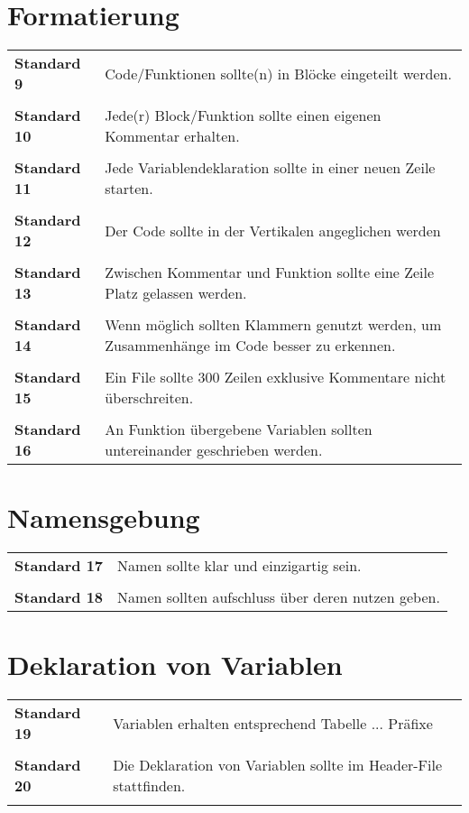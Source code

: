 \section{Formatierung}
\begin{table}[h]
	\begin{tabular}{lp{10cm}}
      \textbf{Standard 9}       & Code/Funktionen sollte(n) in Blöcke eingeteilt werden.\\\\
      \textbf{Standard 10}      & Jede(r) Block/Funktion sollte einen eigenen Kommentar erhalten.\\\\
      \textbf{Standard 11}     & Jede Variablendeklaration sollte in einer neuen Zeile starten.\\\\
      \textbf{Standard 12} & Der Code sollte in der Vertikalen angeglichen werden\\\\ 
      \textbf{Standard 13} & Zwischen Kommentar und Funktion sollte eine Zeile Platz gelassen werden. \\\\
      \textbf{Standard 14} & Wenn möglich sollten Klammern genutzt werden, um Zusammenhänge im Code besser zu erkennen.\\\\
      \textbf{Standard 15} & Ein File sollte 300 Zeilen exklusive Kommentare nicht überschreiten.\\\\
      \textbf{Standard 16} & An Funktion übergebene Variablen sollten untereinander geschrieben werden.
	\end{tabular}
\end{table}
\section{Namensgebung}
\begin{table}[h]
	\begin{tabular}{lp{10cm}}
     \textbf{Standard 17} & Namen sollte klar und einzigartig sein.\\\\
   \textbf{Standard 18}   & Namen sollten aufschluss über deren nutzen geben. 
	\end{tabular}
\end{table}\newpage
\section{Deklaration von Variablen}
\begin{table}[h]
	\begin{tabular}{lp{10cm}}
     \textbf{Standard 19} & Variablen erhalten entsprechend Tabelle ... Präfixe \\\\
\textbf{Standard 20} & Die Deklaration von Variablen sollte im Header-File stattfinden.\\\\  
	\end{tabular}
\end{table}
